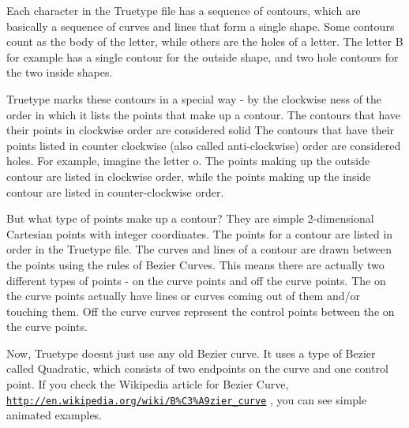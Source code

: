 Each character in the Truetype file has a sequence of \textquotesingle{}contours\textquotesingle{}, which are basically a sequence of curves and lines that form a single shape. Some contours count as the \textquotesingle{}body\textquotesingle{} of the letter, while others are the \textquotesingle{}holes\textquotesingle{} of a letter. The letter \textquotesingle{}B\textquotesingle{} for example has a single contour for the \textquotesingle{}outside\textquotesingle{} shape, and two \textquotesingle{}hole\textquotesingle{} contours for the two inside shapes.

Truetype marks these contours in a special way -\/ by the \textquotesingle{}clockwise\textquotesingle{} ness of the order in which it lists the points that make up a contour. The contours that have their points in \textquotesingle{}clockwise\textquotesingle{} order are considered \textquotesingle{}solid\textquotesingle{} The contours that have their points listed in \textquotesingle{}counter clockwise\textquotesingle{} (also called \textquotesingle{}anti-\/clockwise\textquotesingle{}) order are considered \textquotesingle{}holes\textquotesingle{}. For example, imagine the letter \textquotesingle{}o\textquotesingle{}. The points making up the \textquotesingle{}outside\textquotesingle{} contour are listed in clockwise order, while the points making up the \textquotesingle{}inside\textquotesingle{} contour are listed in counter-\/clockwise order.

But what type of points make up a contour? They are simple 2-\/dimensional Cartesian points with integer coordinates. The points for a contour are listed in order in the Truetype file. The curves and lines of a contour are drawn between the points using the rules of Bezier Curves. This means there are actually two different types of points -\/ \textquotesingle{}on the curve\textquotesingle{} points and \textquotesingle{}off the curve\textquotesingle{} points. The \textquotesingle{}on the curve\textquotesingle{} points actually have lines or curves coming out of them and/or touching them. \textquotesingle{}Off the curve\textquotesingle{} curves represent the \textquotesingle{}control\textquotesingle{} points between the \textquotesingle{}on the curve\textquotesingle{} points.

Now, Truetype doesn\textquotesingle{}t just use any old Bezier curve. It uses a type of Bezier called \textquotesingle{}Quadratic\textquotesingle{}, which consists of two endpoints \textquotesingle{}on the curve\textquotesingle{} and one \textquotesingle{}control point\textquotesingle{}. If you check the Wikipedia article for Bezier Curve, \href{http://en.wikipedia.org/wiki/B%C3%A9zier_curve}{\tt http\+://en.\+wikipedia.\+org/wiki/\+B\%\+C3\%\+A9zier\+\_\+curve} , you can see simple animated examples.

